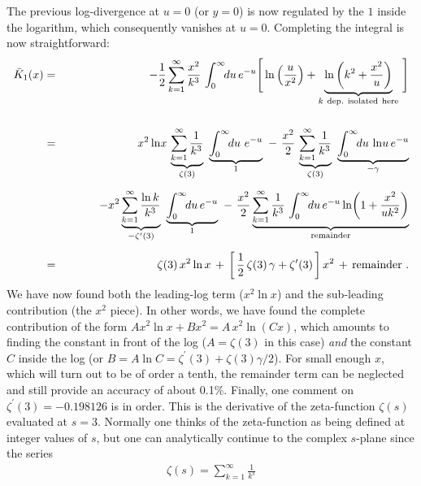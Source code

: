 \documentclass[preprint,12pt,eqsecnum,nofootinbib,amsmath,amssymb]{revtex4}
\begin{document}
The previous log-divergence at $u=0$ (or $y=0$) is
now regulated by the $1$ inside the logarithm, which
consequently vanishes at $u=0$. Completing the
integral is now straightforward:
\begin{eqnarray}
  \bar K_1(x) 
  &=&
  -\frac{1}{2}\sum_{k=1}^\infty \frac{x^2}{k^3}\,
  \int_0^\infty \!\!du\,  e^{-u} \Bigg[
  \ln\left(\frac{u}{x^2}\right) +
  \underbrace{\ln\left( k^2 + \frac{x^2}{u} 
  \right)}_{k~{\rm dep.~isolated~here }} \, \Bigg]
\\[15pt]
  &=&
  x^2 \ln\! x\, \underbrace{\sum_{k=1}^\infty
  \frac{1}{k^3}}_{\zeta(3)} ~ \underbrace{
  \int_0^\infty \!\!du\,\, e^{-u}}_{1} ~-~
  \frac{x^2}{2}\, \underbrace{\sum_{k=1}^\infty
  \frac{1}{k^3}}_{\zeta(3)} ~  \underbrace{
  \int_0^\infty \!\!du\,\ln\! u\,e^{-u}}_{
  -\gamma}
\\[5pt] && \hskip1cm 
\nonumber
  -x^2\underbrace{\sum_{k=1}^\infty \frac{\ln k}
  {k^3}}_{-\zeta^\prime(3)} ~ \underbrace{
  \int_0^\infty \!\!du\,  e^{-u}}_{1} ~-~
  \frac{x^2}{2}\underbrace{\sum_{k=1}^\infty 
  \frac{1}{k^3}\,\int_0^\infty \!\!du\,  e^{-u} 
  \ln\!\left( 1 + \frac{x^2}{u k^2} \right)}_{
  {\rm remainder}}    
\\[5pt]
  &=&
  \zeta(3)\, x^2 \ln x \,+\, 
  \bigg[\, \frac{1}{2} \,\zeta(3)\, \gamma +
  \zeta^\prime(3) \,\bigg]\, x^2 \,+\, {\rm 
  remainder} \ .
\end{eqnarray}
We have now found both the leading-log term ($x^2\ln x$) 
and the sub-leading contribution (the $x^2$ piece). In 
other words, we have found the complete contribution of 
the form $A x^2 \ln x + B x^2 =A\, x^2 \ln(C x)$, which 
amounts to finding the constant in front of the log ($A=
\zeta(3)$ in this case) {\em and} the constant $C$ inside 
the log (or $B=A \ln C = \zeta^\prime(3) + \zeta(3) 
\gamma/2$). For small enough $x$, which will turn out to 
be of order a tenth, the remainder term can be neglected 
and still provide an accuracy of about 0.1\%. Finally, one 
comment on $\zeta^\prime(3)=-0.198126$ is in order. This 
is the derivative of the zeta-function $\zeta(s)$ evaluated
at $s=3$. Normally one thinks of the zeta-function as being 
defined at integer values of $s$, but one can analytically 
continue to the complex $s$-plane since the series
\begin{eqnarray}
  \zeta(s) = \sum_{k=1}^\infty \frac{1}{k^s} 
\end{eqnarray}
\end{document}
